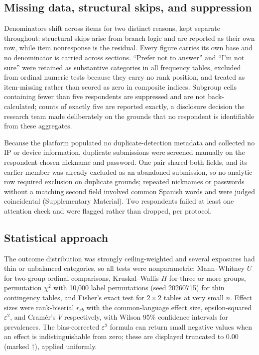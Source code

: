 \documentclass[12pt]{article}
\begin{document}
\subsection{Missing data, structural skips, and suppression}

Denominators shift across items for two distinct reasons, kept separate throughout: structural skips arise
from branch logic and are reported as their own row, while item nonresponse is the residual. Every figure
carries its own base and no denominator is carried across sections. ``Prefer not to answer'' and ``I'm not
sure'' were retained as substantive categories in all frequency tables, excluded from ordinal numeric tests
because they carry no rank position, and treated as item-missing rather than scored as zero in composite
indices. Subgroup cells containing fewer than five respondents are suppressed and are not back-calculated;
counts of exactly five are reported exactly, a disclosure decision the research team made deliberately on
the grounds that no respondent is identifiable from these aggregates.

Because the platform populated no duplicate-detection metadata and collected no IP or device information,
duplicate submissions were screened manually on the respondent-chosen nickname and password. One pair
shared both fields, and its earlier member was already excluded as an abandoned submission, so no analytic
row required exclusion on duplicate grounds; repeated nicknames or passwords without a matching second
field involved common Spanish words and were judged coincidental (Supplementary Material). Two respondents
failed at least one attention check and were flagged rather than dropped, per protocol.

\subsection{Statistical approach}

The outcome distribution was strongly ceiling-weighted and several exposures had thin or unbalanced
categories, so all tests were nonparametric: Mann--Whitney $U$ for two-group ordinal comparisons,
Kruskal--Wallis $H$ for three or more groups, permutation $\chi^2$ with 10,000 label permutations (seed
20260715) for thin contingency tables, and Fisher's exact test for $2\times2$ tables at very small $n$.
Effect sizes were rank-biserial $r_{rb}$ with the common-language effect size, epsilon-squared
$\varepsilon^2$, and Cram\'er's $V$ respectively, with Wilson 95\% confidence intervals for prevalences.
The bias-corrected $\varepsilon^2$ formula can return small negative values when an effect is
indistinguishable from zero; these are displayed truncated to 0.00 (marked $\dagger$), applied uniformly.
\end{document}
